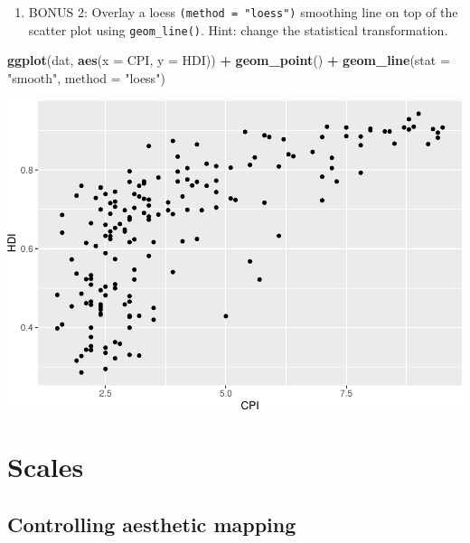 \documentclass[
]{book}
\newenvironment{Shaded}{\begin{snugshade}}{\end{snugshade}}
\newcommand{\DataTypeTok}[1]{\textcolor[rgb]{0.13,0.29,0.53}{#1}}
\newcommand{\KeywordTok}[1]{\textcolor[rgb]{0.13,0.29,0.53}{\textbf{#1}}}
\newcommand{\NormalTok}[1]{#1}
\newcommand{\OperatorTok}[1]{\textcolor[rgb]{0.81,0.36,0.00}{\textbf{#1}}}
\newcommand{\StringTok}[1]{\textcolor[rgb]{0.31,0.60,0.02}{#1}}
\providecommand{\tightlist}{%
  \setlength{\itemsep}{0pt}\setlength{\parskip}{0pt}}
\begin{document}
\begin{enumerate}
\def\labelenumi{\arabic{enumi}.}
\setcounter{enumi}{5}
\tightlist
\item
  BONUS 2: Overlay a loess \texttt{(method\ =\ "loess")} smoothing line on top of the scatter plot using \texttt{geom\_line()}. Hint: change the statistical transformation.
\end{enumerate}

\begin{Shaded}
\begin{Highlighting}[]
\KeywordTok{ggplot}\NormalTok{(dat, }\KeywordTok{aes}\NormalTok{(}\DataTypeTok{x =}\NormalTok{ CPI, }\DataTypeTok{y =}\NormalTok{ HDI)) }\OperatorTok{+}
\StringTok{  }\KeywordTok{geom\_point}\NormalTok{() }\OperatorTok{+}
\StringTok{  }\KeywordTok{geom\_line}\NormalTok{(}\DataTypeTok{stat =} \StringTok{"smooth"}\NormalTok{, }\DataTypeTok{method =} \StringTok{"loess"}\NormalTok{)}
\end{Highlighting}
\end{Shaded}

\includegraphics{R/Rgraphics/figures/unnamed-chunk-197-1.pdf}

\hypertarget{scales}{%
\section{Scales}\label{scales}}

\hypertarget{controlling-aesthetic-mapping}{%
\subsection{Controlling aesthetic mapping}\label{controlling-aesthetic-mapping}}
\end{document}
